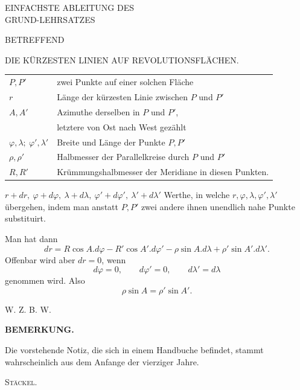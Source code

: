 \clearpage
{}
\begin{center}\large EINFACHSTE ABLEITUNG DES\\GRUND-LEHRSATZES\end{center}
\begin{center}BETREFFEND\end{center}
\begin{center}\large DIE KÜRZESTEN LINIEN AUF REVOLUTIONSFLÄCHEN.\end{center}
\begin{center}\begin{tabular}{lp{.73\linewidth}}
$P,P'$ & zwei Punkte auf einer solchen Fläche\\
$r$ & Länge der kürzesten Linie zwischen $P$ und $P'$\\
$A,A'$ & Azimuthe derselben in $P$ und $P'$,\\
& letztere von Ost nach West gezählt\\
$\varphi,\lambda;\ \varphi',\lambda'$ & Breite und Länge der Punkte $P,P'$\\
$\rho,\rho'$ & Halbmesser der Parallelkreise durch $P$ und $P'$\\
$R,R'$ & Krümmungshalbmesser der Meridiane in diesen Punkten.
\end{tabular}\end{center}
\noindent $r+dr,\ \varphi+d\varphi,\ \lambda+d\lambda,\ \varphi'+d\varphi',\ \lambda'+d\lambda'$ Werthe, in welche $r,\varphi,\lambda,\varphi',\lambda'$ übergehen, indem man anstatt $P,P'$ zwei andere ihnen unendlich nahe Punkte substituirt.

Man hat dann
\[
dr=R\cos A.d\varphi-R'\cos A'.d\varphi'-\rho\sin A.d\lambda+\rho'\sin A'.d\lambda'.
\]
\noindent Offenbar wird aber $dr=0$, wenn
\[
d\varphi=0,\qquad d\varphi'=0,\qquad d\lambda'=d\lambda
\]
\noindent genommen wird. Also
\[
\rho\sin A=\rho'\sin A'.
\]
\begin{flushright}W. Z. B. W.\end{flushright}
\begin{center}\textbf{BEMERKUNG.}\end{center}
\noindent\hspace*{1.2em}Die vorstehende Notiz, die sich in einem Handbuche befindet, stammt wahrscheinlich aus dem Anfange der vierziger Jahre.
\begin{flushright}\textsc{Stäckel}.\end{flushright}

